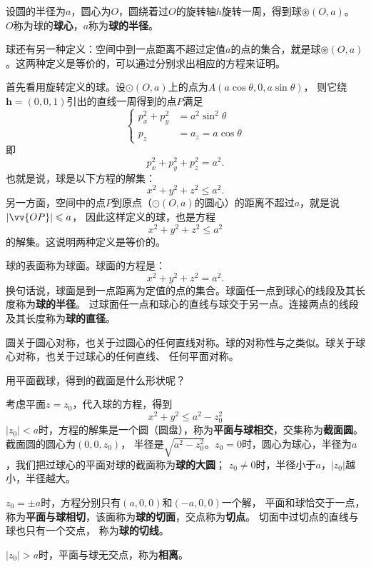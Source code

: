 \documentclass[12pt,UTF8]{ctexbook}
\begin{document}
设圆的半径为$a$，圆心为$O$，圆绕着过$O$的旋转轴$h$旋转一周，得到球$\circledast(O,a)$。
$O$称为球的\textbf{球心}，$a$称为\textbf{球的半径}。

球还有另一种定义：空间中到一点距离不超过定值$a$的点的集合，就是球$\circledast(O,a)$。这两种定义是等价的，可以通过分别求出相应的方程来证明。

首先看用旋转定义的球。设$\odot(O,a)$上的点为$A(a\cos{\theta}, 0, a\sin{\theta})$，
则它绕$\mathbf{h} = (0,0,1)$引出的直线一周得到的点$P$满足
$$
\left\{
\begin{array}{rl}
p_x^2+p_y^2 &= a^2\sin^2{\theta} \\
p_z &= a_z = a\cos{\theta}
\end{array}
\right.
$$
即
$$ p_x^2 + p_y^2 + p_z^2 = a^2.$$
也就是说，球是以下方程的解集：
$$ x^2 + y^2 + z^2 \leqslant a^2.$$
另一方面，空间中的点$P$到原点（$\odot(O,a)$的圆心）的距离不超过$a$，就是说$\left|\vv{OP}\right| \leqslant a$​，
因此这样定义的球，也是方程
$$ x^2 + y^2 + z^2 \leqslant a^2$$
的解集。这说明两种定义是等价的。

球的表面称为球面。球面的方程是：
$$ x^2 + y^2 + z^2 = a^2.$$
换句话说，球面是到一点距离为定值的点的集合。球面任一点到球心的线段及其长度称为\textbf{球的半径}。
过球面任一点和球心的直线与球交于另一点。连接两点的线段及其长度称为\textbf{球的直径}。

圆关于圆心对称，也关于过圆心的任何直线对称。球的对称性与之类似。球关于球心对称，也关于过球心的任何直线、
任何平面对称。

用平面截球，得到的截面是什么形状呢？

考虑平面$z=z_0$，代入球的方程，得到
$$ x^2 + y^2 \leqslant a^2-z_0^2 $$
$|z_0|<a$时，方程的解集是一个圆（圆盘），称为\textbf{平面与球相交}，交集称为\textbf{截面圆}。截面圆的圆心为$(0,0,z_0)$，
半径是$\sqrt{a^2-z_0^2}$。$z_0=0$时，圆心为球心，半径为$a$，我们把过球心的平面对球的截面称为\textbf{球的大圆}；
$z_0\neq 0$时，半径小于$a$，$|z_0|$越小，半径越大。

$z_0=\pm a$时，方程分别只有$(a,0,0)$和$(-a,0,0)$一个解，
平面和球恰交于一点，称为\textbf{平面与球相切}，该面称为\textbf{球的切面}，交点称为\textbf{切点}。
切面中过切点的直线与球也只有一个交点，
称为\textbf{球的切线}。

$|z_0|>a$时，平面与球无交点，称为\textbf{相离}。
\end{document}

